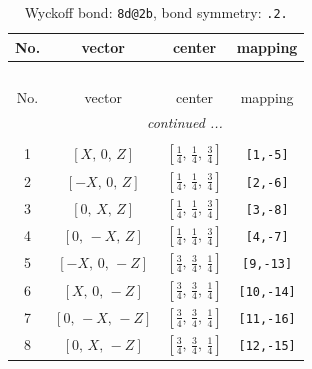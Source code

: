 \documentclass[fleqn,8pt]{jsarticle}
\begin{document}
\renewcommand{\arraystretch}{1.2}
\begin{longtable}{cccc}
\caption{Wyckoff bond: {\tt 8d@2b}, bond symmetry: {\tt .2.}}
 \\
 \hline \hline
No. & vector & center & mapping \\ \hline \endfirsthead

\multicolumn{3}{l}{\tablename\ \thetable{}} \\
 \hline \hline
No. & vector & center & mapping \\ \hline \endhead

 \hline \hline
\multicolumn{3}{r}{\footnotesize\it continued ...} \\ \endfoot

 \hline \hline
\multicolumn{3}{r}{} \\ \endlastfoot

1 & $\left[ X,\, 0,\, Z \right]$ & $\left[ \frac{1}{4},\, \frac{1}{4},\, \frac{3}{4} \right]$ & {\tt [1,-5]} \\ \hline
2 & $\left[ - X,\, 0,\, Z \right]$ & $\left[ \frac{1}{4},\, \frac{1}{4},\, \frac{3}{4} \right]$ & {\tt [2,-6]} \\ \hline
3 & $\left[ 0,\, X,\, Z \right]$ & $\left[ \frac{1}{4},\, \frac{1}{4},\, \frac{3}{4} \right]$ & {\tt [3,-8]} \\ \hline
4 & $\left[ 0,\, - X,\, Z \right]$ & $\left[ \frac{1}{4},\, \frac{1}{4},\, \frac{3}{4} \right]$ & {\tt [4,-7]} \\ \hline
5 & $\left[ - X,\, 0,\, - Z \right]$ & $\left[ \frac{3}{4},\, \frac{3}{4},\, \frac{1}{4} \right]$ & {\tt [9,-13]} \\ \hline
6 & $\left[ X,\, 0,\, - Z \right]$ & $\left[ \frac{3}{4},\, \frac{3}{4},\, \frac{1}{4} \right]$ & {\tt [10,-14]} \\ \hline
7 & $\left[ 0,\, - X,\, - Z \right]$ & $\left[ \frac{3}{4},\, \frac{3}{4},\, \frac{1}{4} \right]$ & {\tt [11,-16]} \\ \hline
8 & $\left[ 0,\, X,\, - Z \right]$ & $\left[ \frac{3}{4},\, \frac{3}{4},\, \frac{1}{4} \right]$ & {\tt [12,-15]} \\
\end{longtable}
\renewcommand{\arraystretch}{1.2}
\end{document}
